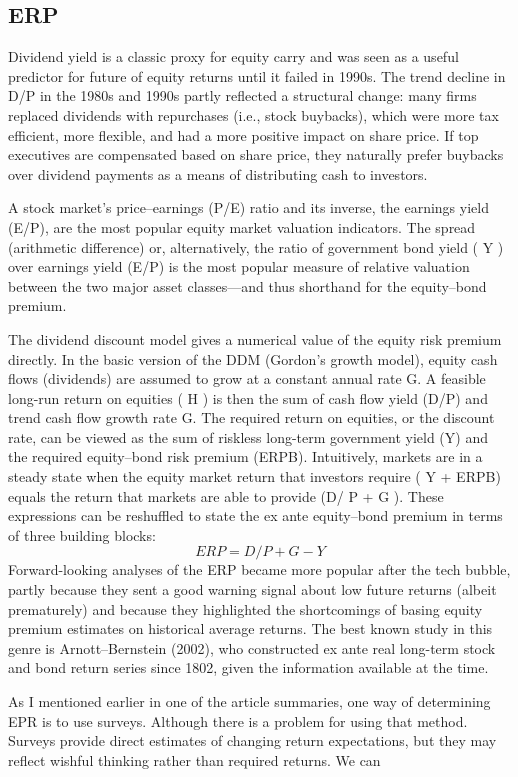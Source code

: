 \documentclass[12 pt]{article}
\begin{document}
\subsection{ERP}
Dividend yield is a classic proxy for equity carry and was seen as a useful predictor for future of equity returns until it failed in 1990s. The trend decline in D/P in the 1980s and 1990s partly reflected a structural change: many firms replaced dividends with repurchases (i.e.,
stock buybacks), which were more tax efficient, more flexible, and had a more positive impact on share price. If top executives are compensated based on share price, they naturally prefer buybacks over dividend payments as a means of distributing cash to investors.
\par A stock market’s price–earnings (P/E) ratio and its inverse, the earnings yield (E/P), are the most popular equity market valuation indicators. The spread (arithmetic difference) or, alternatively, the ratio of government bond yield ( Y ) over earnings yield (E/P) is the most popular measure of relative valuation between the two major asset classes—and thus shorthand for the equity–bond premium. 
\par The dividend discount model gives a numerical value of the equity risk premium directly. In the basic version of the DDM (Gordon’s growth model), equity cash flows (dividends) are assumed to grow at a constant annual rate G. A
feasible long-run return on equities ( H ) is then the sum of cash flow yield (D/P) and trend cash flow growth rate G. The required return on equities, or the discount rate, can be viewed as the sum of riskless long-term government yield (Y) and the required equity–bond risk premium (ERPB). Intuitively, markets are in a steady state when the equity market return that investors require ( Y + ERPB) equals the return that markets are able to provide (D/ P + G ). These expressions can be reshuffled to state the ex ante equity–bond premium in terms of three building blocks:
\[
ERP = D/P + G -Y
\]
Forward-looking analyses of the ERP became more popular after the tech bubble, partly because they sent a good warning signal about low
future returns (albeit prematurely) and because they highlighted the shortcomings of basing equity premium estimates on historical average returns. The best known study in this genre is Arnott–Bernstein (2002), who constructed ex ante real long-term stock and bond return series since 1802, given the information available at the time.
\par As I mentioned earlier in one of the article summaries, one way of determining EPR is to use surveys. Although there is a problem for using that method. Surveys provide direct estimates of changing return expectations, but they may reflect wishful thinking rather than required returns. We can
\end{document}

